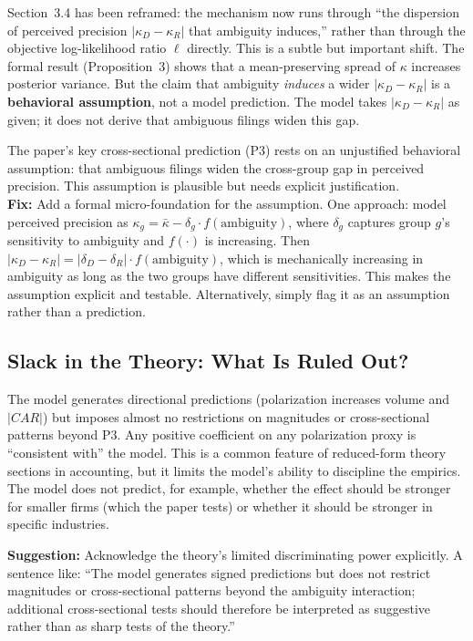 \documentclass[11pt]{article}
\begin{document}
Section~3.4 has been reframed: the mechanism now runs through ``the dispersion of perceived precision $|\kappa_D - \kappa_R|$ that ambiguity induces,'' rather than through the objective log-likelihood ratio $\ell$ directly. This is a subtle but important shift. The formal result (Proposition~3) shows that a mean-preserving spread of $\kappa$ increases posterior variance. But the claim that ambiguity \emph{induces} a wider $|\kappa_D - \kappa_R|$ is a \textbf{behavioral assumption}, not a model prediction. The model takes $|\kappa_D - \kappa_R|$ as given; it does not derive that ambiguous filings widen this gap.

\begin{majorbox}
The paper's key cross-sectional prediction (P3) rests on an unjustified behavioral assumption: that ambiguous filings widen the cross-group gap in perceived precision. This assumption is plausible but needs explicit justification.\\[4pt]
\textbf{Fix:} Add a formal micro-foundation for the assumption. One approach: model perceived precision as $\kappa_g = \bar\kappa - \delta_g \cdot f(\text{ambiguity})$, where $\delta_g$ captures group $g$'s sensitivity to ambiguity and $f(\cdot)$ is increasing. Then $|\kappa_D - \kappa_R| = |\delta_D - \delta_R| \cdot f(\text{ambiguity})$, which is mechanically increasing in ambiguity as long as the two groups have different sensitivities. This makes the assumption explicit and testable. Alternatively, simply flag it as an assumption rather than a prediction.
\end{majorbox}

\subsection{Slack in the Theory: What Is Ruled Out?}

The model generates directional predictions (polarization increases volume and $|CAR|$) but imposes almost no restrictions on magnitudes or cross-sectional patterns beyond P3. Any positive coefficient on any polarization proxy is ``consistent with'' the model. This is a common feature of reduced-form theory sections in accounting, but it limits the model's ability to discipline the empirics. The model does not predict, for example, whether the effect should be stronger for smaller firms (which the paper tests) or whether it should be stronger in specific industries.

\begin{minorbox}
\textbf{Suggestion:} Acknowledge the theory's limited discriminating power explicitly. A sentence like: ``The model generates signed predictions but does not restrict magnitudes or cross-sectional patterns beyond the ambiguity interaction; additional cross-sectional tests should therefore be interpreted as suggestive rather than as sharp tests of the theory.''
\end{minorbox}
\end{document}
